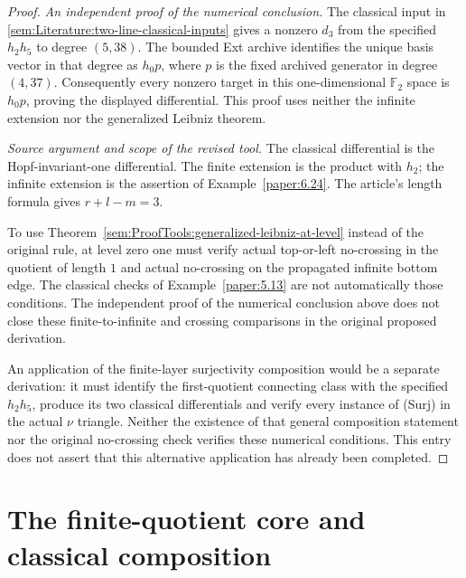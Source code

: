 \begin{proof}
\textit{An independent proof of the numerical conclusion.} The classical
input in \ref{sem:Literature:two-line-classical-inputs} gives a nonzero
$d_3$ from the specified $h_2h_5$ to degree $(5,38)$. The bounded Ext
archive identifies the unique basis vector in that degree as $h_0p$,
where $p$ is the fixed archived generator in degree $(4,37)$.
Consequently every nonzero target in this one-dimensional
$\mathbb F_2$ space is $h_0p$, proving the displayed differential.
This proof uses neither the infinite extension nor the generalized
Leibniz theorem.

\textit{Source argument and scope of the revised tool.} The classical differential is the Hopf-invariant-one differential. The finite extension is the product with $h_2$; the infinite extension is the assertion of Example~\ref{paper:6.24}. The article's length formula gives $r+l-m=3$.

To use Theorem~\ref{sem:ProofTools:generalized-leibniz-at-level} instead of the original rule, at level zero one must verify actual top-or-left no-crossing in the quotient of length $1$ and actual no-crossing on the propagated infinite bottom edge. The classical checks of Example~\ref{paper:5.13} are not automatically those conditions. The independent proof of the numerical conclusion above does not close these finite-to-infinite and crossing comparisons in the original proposed derivation.

An application of the finite-layer surjectivity composition would be
a separate derivation: it must identify the first-quotient connecting
class with the specified $h_2h_5$, produce its two classical
differentials and verify every instance of (Surj) in the actual
$\nu$ triangle. Neither the existence of that general composition
statement nor the original no-crossing check verifies these
numerical conditions. This entry does not assert that this
alternative application has already been completed.
\end{proof}

\section{The finite-quotient core and classical composition}

